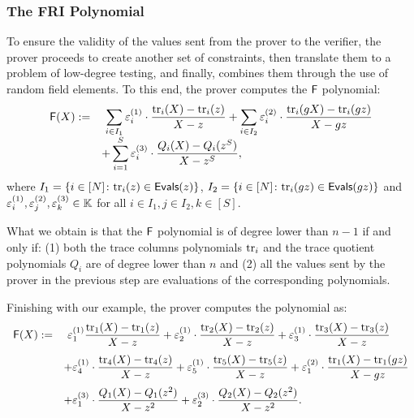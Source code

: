 \subsubsection*{The FRI Polynomial}

To ensure the validity of the values sent from the prover to the verifier, the prover proceeds to create another set of constraints, then translate them to a problem of low-degree testing, and finally, combines them through the use of random field elements. To this end, the prover computes the $\textsf{F}$ polynomial:
\begin{align}\label{eq:FRI}
\begin{array}{rl}
\textsf{F}(X) := &\displaystyle~\sum_{i \in I_1} \varepsilon^{(1)}_i \cdot \frac{\text{tr}_i(X) - \text{tr}_i(z)}{X - z} + \sum_{i \in I_2} \varepsilon^{(2)}_i \cdot \frac{\text{tr}_i(gX) - \text{tr}_i(gz)}{X - gz} \\[0.2cm]
	&\displaystyle + \sum_{i=1}^S \varepsilon^{(3)}_i \cdot \frac{Q_i(X) - Q_i(z^S)}{X - z^S},
\end{array}
\end{align}
where $I_1 = \{i \in [N] \colon \text{tr}_i(z) \in \textsf{Evals}(z)\}$, $I_2 = \{i \in [N] \colon \text{tr}_i(gz) \in \textsf{Evals}(gz)\}$ and $\varepsilon^{(1)}_i,\varepsilon^{(2)}_j,\varepsilon^{(3)}_k \in \mathbb{K}$ for all $i \in I_1,j\in I_2, k\in[S]$.

What we obtain is that the $\textsf{F}$ polynomial is of degree lower than $n-1$ if and only if: (1) both the trace columns polynomials $\text{tr}_i$ and the trace quotient polynomials $Q_i$ are of degree lower than $n$ and (2) all the values sent by the prover in the previous step are evaluations of the corresponding polynomials.

Finishing with our example, the prover computes the \FRI polynomial as:
\begin{align*}
\begin{array}{rl}
  \textsf{F}(X) := &\displaystyle~\varepsilon_1^{(1)} \frac{\text{tr}_1(X) - \text{tr}_1(z)}{X-z} + \varepsilon_2^{(1)} \cdot \frac{\text{tr}_2(X) - \text{tr}_2(z)}{X-z} + \varepsilon_3^{(1)} \cdot \frac{\text{tr}_3(X) - \text{tr}_3(z)}{X-z} \\[0.4cm]
  &\displaystyle + \varepsilon_4^{(1)} \cdot \frac{\text{tr}_4(X) - \text{tr}_4(z)}{X-z} + \varepsilon_5^{(1)} \cdot \frac{\text{tr}_5(X) - \text{tr}_5(z)}{X-z} + \varepsilon_1^{(2)} \cdot \frac{\text{tr}_1(X) - \text{tr}_1(gz)}{X-gz}\\[0.4cm]
  &\displaystyle + \varepsilon_1^{(3)} \cdot \frac{Q_1(X) - Q_1(z^2)}{X-z^2} + \varepsilon_2^{(3)} \cdot \frac{Q_2(X) - Q_2(z^2)}{X-z^2}.
\end{array}
\end{align*}

